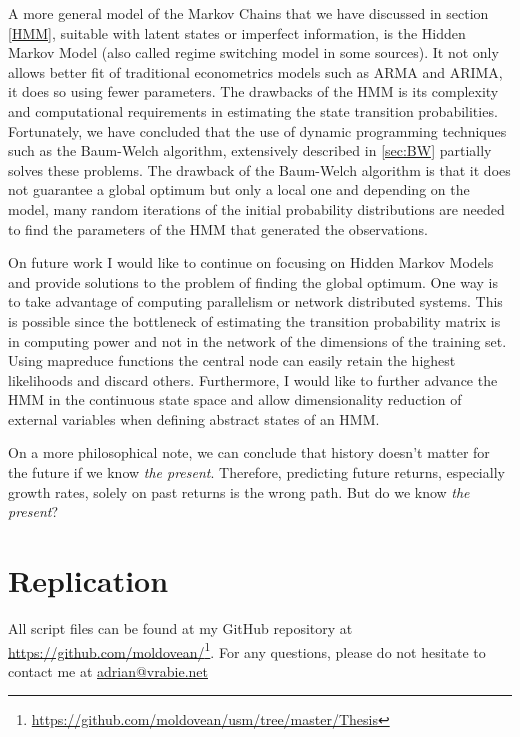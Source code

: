 \documentclass[a4paper,12pt]{article}
\theoremstyle{definition}
\begin{document}
A more general model of the Markov Chains that we have discussed in section \ref{HMM}, suitable with latent states or imperfect information, is the Hidden Markov Model (also called regime switching model in some sources). It not only allows better fit of traditional econometrics models such as ARMA and ARIMA, it does so using fewer parameters. The drawbacks of the HMM is its complexity and computational requirements in estimating the state transition probabilities. Fortunately, we have concluded that the use of dynamic programming techniques such as the Baum-Welch algorithm, extensively described in \ref{sec:BW} partially solves these problems. The drawback of the Baum-Welch algorithm is that it does not guarantee a global optimum but only a local one and depending on the model, many random iterations of the initial probability distributions are needed to find the parameters of the HMM that generated the observations. 

On future work I would like to continue on focusing on Hidden Markov Models and provide solutions to the problem of finding the global optimum. One way is to take advantage of computing parallelism or network distributed systems. This is possible since the bottleneck of estimating the transition probability matrix is in computing power and not in the network of the dimensions of the training set. Using mapreduce functions the central node can easily retain the highest likelihoods and discard others. Furthermore, I would like to further advance the HMM in the continuous state space and allow dimensionality reduction of external variables when defining abstract states of an HMM. 

On a more philosophical note, we can conclude that history doesn't matter for the future if we know \textit{the present}. Therefore, predicting future returns, especially growth rates, solely on past returns is the wrong path. But do we know \textit{the present}? 

\newpage
\appendix
\section{Replication}
All script files can be found at my GitHub repository at \href{https://github.com/moldovean/usm/tree/master/Thesis}{https://github.com/moldovean/}\footnote{\href{https://github.com/moldovean/usm/tree/master/Thesis}{https://github.com/moldovean/usm/tree/master/Thesis}}.
For any questions, please do not hesitate to contact me at \href{adrian@vrabie.net}{adrian@vrabie.net}
\end{document}
